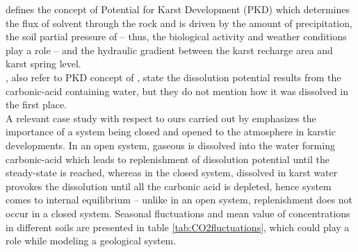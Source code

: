 \citet{mangin1975contribution} defines the concept of Potential for Karst Development (PKD) which determines the flux of solvent 
through the rock and is driven by the amount of precipitation, the soil partial pressure of  -- thus, the biological activity 
and weather conditions play a role -- and the hydraulic gradient between the karst recharge area and karst spring level. \\

\citet{mohammadi2007method}, also refer to PKD concept of \citet{mangin1975contribution}, state the dissolution potential results from 
the carbonic-acid containing water, but they do not mention how it was dissolved in the first place. \\

A relevant case study with respect to ours carried out by \citet{atkinson1977carbon} emphasizes the importance of a 
system being closed and opened to the atmosphere in karstic developments. In an open system, gaseous  is dissolved into the water 
forming carbonic-acid which leads to replenishment of dissolution potential until the steady-state 
is reached, whereas in the closed system, dissolved  in karst water provokes the dissolution until all the carbonic acid is depleted, 
hence system comes to internal equilibrium -- unlike in an open system, replenishment does not occur in a closed system. 
Seasonal fluctuations and mean value of  concentrations in different soils are presented in table \ref{tab:CO2fluctuations}, 
which could play a role while modeling a geological system. \\

